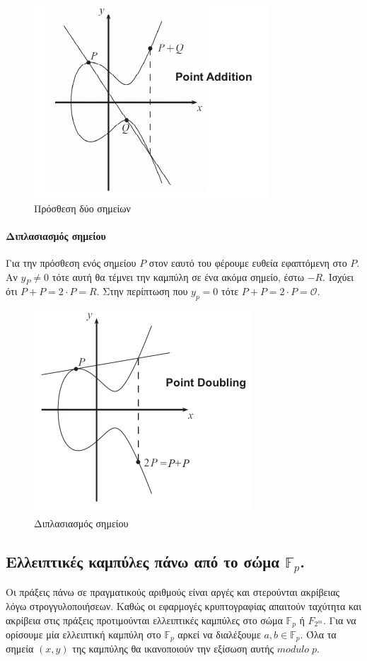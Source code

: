 \documentclass[12pt]{article}
\begin{document}
\begin{figure}[H]
\center
\includegraphics[scale=0.7]{add.png}
\caption{Πρόσθεση δύο σημείων \cite{PAAR}}
\end{figure}

\paragraph{Διπλασιασμός σημείου}
Για την πρόσθεση ενός σημείου $P$ στον εαυτό του φέρουμε ευθεία εφαπτόμενη στο $P$. Αν $y_P \neq 0$ τότε αυτή θα τέμνει την καμπύλη σε ένα ακόμα σημείο, έστω $-R$. Ισχύει ότι $P + P = 2 \cdot P = R$.
Στην περίπτωση που $y_p = 0$ τότε $P + P = 2 \cdot P = \mathcal{O}$.

\begin{figure}[H]
\center
\includegraphics[scale=0.7]{double.png}
\caption{Διπλασιασμός σημείου \cite{PAAR}}
\end{figure}
\subsection{Ελλειπτικές καμπύλες πάνω από το σώμα $\mathbb{F}_p$.}
Οι πράξεις πάνω σε πραγματικούς αριθμούς είναι αργές και στερούνται ακρίβειας λόγω στρογγυλοποιήσεων. Καθώς οι εφαρμογές κρυπτογραφίας απαιτούν ταχύτητα και ακρίβεια στις πράξεις προτιμούνται ελλειπτικές καμπύλες στο σώμα $\mathbb{F}_p$ ή $F_{2^m}$.
Για να ορίσουμε μία ελλειπτική καμπύλη στο $\mathbb{F}_p$ αρκεί να διαλέξουμε $a,b \in \mathbb{F}_p$. Όλα τα σημεία $(x,y)$ της καμπύλης θα ικανοποιούν την εξίσωση αυτής $modulo \; p$.
\end{document}
